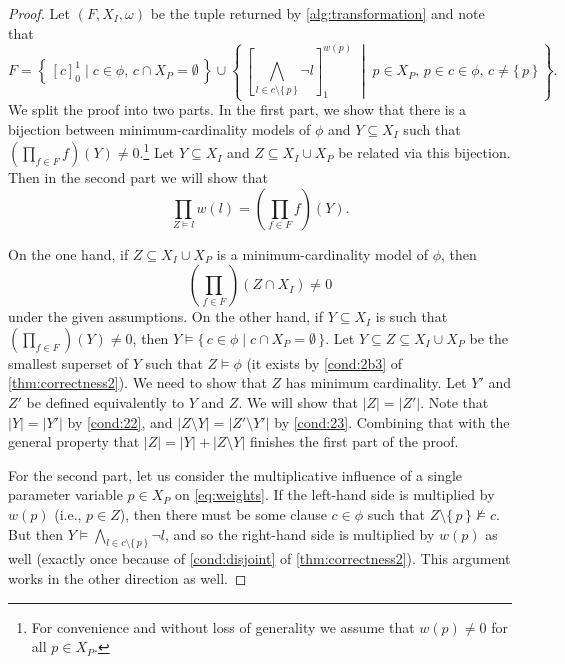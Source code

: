 \begin{proof}
  Let $(F, X_I, \omega)$ be the tuple returned by \cref{alg:transformation} and
  note that
  \[
    F = \left\{\, {[c]}_0^1 \mid c \in \phi \text{, } c \cap X_P = \emptyset \,\right\} \cup \left\{\, {\left[ \bigwedge_{l \in c \setminus \{\, p \,\}} \neg l \right]}_1^{w(p)} \;\middle|\; p \in X_P \text{, } p \in c \in \phi \text{, } c \ne \{\, p \,\} \,\right\}.
  \]
  We split the proof into two parts. In the first part, we show that there is a
  bijection between minimum-cardinality models of $\phi$ and $Y \subseteq X_I$
  such that $\left(\prod_{f \in F} f\right)(Y) \ne 0$.\footnote{For convenience
    and without loss of generality we assume that $w(p) \ne 0$ for all
    $p \in X_P$.} Let $Y \subseteq X_I$ and $Z \subseteq X_I \cup X_P$ be
  related via this bijection. Then in the second part we will show that
  \begin{equation} \label{eq:weights}
    \prod_{Z \models l} w(l) = \left(\prod_{f \in F} f\right)(Y).
  \end{equation}

  On the one hand, if $Z \subseteq X_I \cup X_P$ is a minimum-cardinality model
  of $\phi$, then
  \[
    \left(\prod_{f \in F}\right)(Z \cap X_I) \ne 0
  \]
  under the given assumptions. On the other hand, if $Y \subseteq X_I$ is such
  that $\left(\prod_{f \in F}\right)(Y) \ne 0$, then
  $Y \models \{\, c \in \phi \mid c \cap X_P = \emptyset \,\}$. Let
  $Y \subseteq Z \subseteq X_I \cup X_P$ be the smallest superset of $Y$ such
  that $Z \models \phi$ (it exists by \cref{cond:2b3} of
  \cref{thm:correctness2}). We need to show that $Z$ has minimum cardinality.
  Let $Y'$ and $Z'$ be defined equivalently to $Y$ and $Z$. We will show that
  $|Z| = |Z'|$. Note that $|Y| = |Y'|$ by \cref{cond:22}, and
  $|Z \setminus Y| = |Z' \setminus Y'|$ by \cref{cond:23}. Combining that with
  the general property that $|Z| = |Y| + |Z \setminus Y|$ finishes the first
  part of the proof.

  For the second part, let us consider the multiplicative influence of a single
  parameter variable $p \in X_P$ on \cref{eq:weights}. If the left-hand side is
  multiplied by $w(p)$ (i.e., $p \in Z$), then there must be some clause
  $c \in \phi$ such that $Z \setminus \{\, p \,\} \not\models c$. But then
  $Y \models \bigwedge_{l \in c \setminus \{\, p \,\}} \neg l$, and so the
  right-hand side is multiplied by $w(p)$ as well (exactly once because of
  \cref{cond:disjoint} of \cref{thm:correctness2}). This argument works in the
  other direction as well.
\end{proof}

